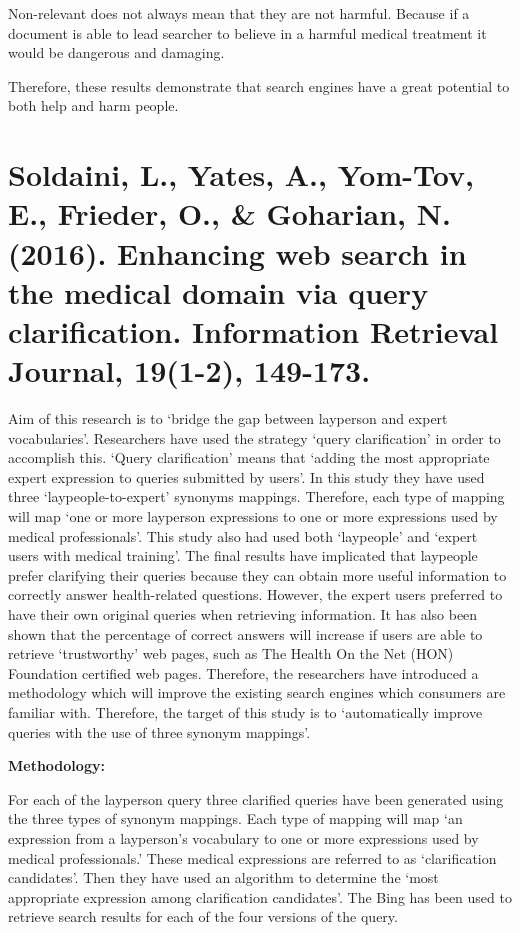 \documentclass[]{article}
\begin{document}
Non-relevant does not always mean that they are not harmful. Because if a document is able to lead searcher to believe in a harmful medical treatment it would be dangerous and damaging. 
  
Therefore, these results demonstrate that search engines have a great potential to both help and harm people. 


\section{Soldaini, L., Yates, A., Yom-Tov, E., Frieder, O., \& Goharian, N. (2016). Enhancing web search in the medical domain via query clarification. Information Retrieval Journal, 19(1-2), 149-173.}

Aim of this research is to ‘bridge the gap between layperson and expert vocabularies’.  Researchers have used the strategy ‘query clarification’ in order to accomplish this. ‘Query clarification’ means that ‘adding the most appropriate expert expression to queries submitted by users’. In this study they have used three ‘laypeople-to-expert’ synonyms mappings. Therefore, each type of mapping will map ‘one or more layperson expressions to one or more expressions used by medical professionals’. This study also had used both ‘laypeople’ and ‘expert users with medical training’. The final results have implicated that laypeople prefer clarifying their queries because they can obtain more useful information to correctly answer health-related questions. However, the expert users preferred to have their own original queries when retrieving information. It has also been shown that the percentage of correct answers will increase if users are able to retrieve ‘trustworthy’ web pages, such as The Health On the Net (HON) Foundation certified web pages. Therefore, the researchers have introduced a methodology which will improve the existing search engines which consumers are familiar with. Therefore, the target of this study is to ‘automatically improve queries with the use of three synonym mappings’.

\textbf{Methodology:}

For each of the layperson query three clarified queries have been generated using the three types of synonym mappings. Each type of mapping will map ‘an expression from a layperson’s vocabulary to one or more expressions used by medical professionals.’ These medical expressions are referred to as ‘clarification candidates’. Then they have used an algorithm to determine the ‘most appropriate expression among clarification candidates’. The Bing has been used to retrieve search results for each of the four versions of the query. 
\end{document}
